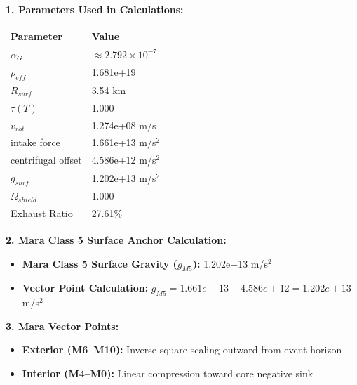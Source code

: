 \documentclass[11pt, a4paper]{article}
\begin{document}
\vspace{0.5em}
\noindent \textbf{1. Parameters Used in Calculations:}
\begin{center}
  \begin{tabular}{|l|l|}
    \hline
    \textbf{Parameter} & \textbf{Value} \\ \hline
    $\alpha_G$ & $\approx 2.792 \times 10^{-7}$ \\ \hline
    $\rho_{eff}$ & 1.681e+19 \\ \hline
    $R_{surf}$ & 3.54 km \\ \hline
    $\tau(T)$ & 1.000 \\ \hline
    $v_{rot}$ & 1.274e+08 m/s \\ \hline
    intake force & 1.661e+13 m/s$^2$ \\ \hline
    centrifugal offset & 4.586e+12 m/s$^2$ \\ \hline
    $g_{surf}$ & 1.202e+13 m/s$^2$ \\ \hline
    $\Omega_{shield}$ & 1.000 \\ \hline
    Exhaust Ratio & 27.61\% \\ \hline
  \end{tabular}
\end{center}

\vspace{0.5em}
\noindent \textbf{2. Mara Class 5 Surface Anchor Calculation:}
\begin{itemize}
  \item \textbf{Mara Class 5 Surface Gravity ($g_{M5}$):} 1.202e+13 m/s$^2$
  \item \textbf{Vector Point Calculation:} $g_{M5} = 1.661e+13 - 4.586e+12 = 1.202e+13$ m/s$^2$
\end{itemize}

\vspace{0.5em}
\noindent \textbf{3. Mara Vector Points:}
\begin{itemize}
  \item \textbf{Exterior (M6--M10):} Inverse-square scaling outward from event horizon
  \item \textbf{Interior (M4--M0):} Linear compression toward core negative sink
\end{itemize}
\end{document}
